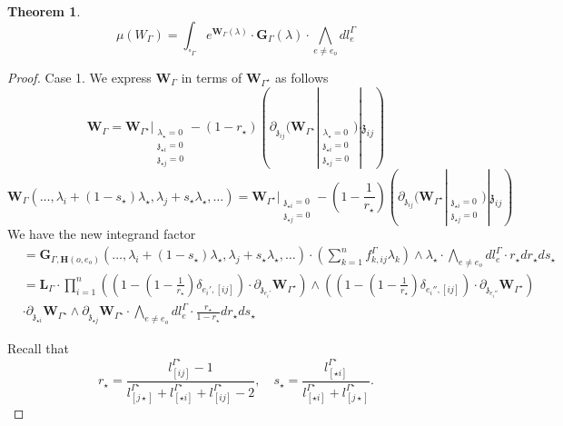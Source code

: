 \documentclass[11pt]{amsart}
\newtheorem{thm}{Theorem}[section]
\theoremstyle{definition}
\theoremstyle{remark}
\numberwithin{equation}{section}
\begin{document}
\begin{thm}
  $$
  \mu(W_{\Gamma})=\int_{\square_{\Gamma}}e^{\mathbf{W}_{\Gamma}(\lambda)}\cdot \mathbf{G}_{\Gamma}(\lambda)\cdot\bigwedge_{e\neq e_{o}}dl^{\Gamma}_{e}
  $$
\end{thm}
\begin{proof}

Case 1. We express $\mathbf{W}_{\Gamma}$ in terms of $\mathbf{W}_{\Gamma^{\star}}$ as follows
$$
\mathbf{W}_{\Gamma}=\mathbf{W}_{\Gamma^{\star}}|_{\substack{\lambda_{\star}=0\\ \mathfrak{z}_{\star i}=0\\\mathfrak{z}_{\star j}=0}}-(1-r_{\star})\left(\partial_{\mathfrak{z}_{ij}}(\mathbf{W}_{\Gamma^{\star}}|_{\substack{\lambda_{\star}=0\\ \mathfrak{z}_{\star i}=0\\\mathfrak{z}_{\star j}=0}})|\mathfrak{z}_{ij}\right)
$$
$$
\mathbf{W}_{\Gamma}(\dots,\lambda_i+(1-s_{\star})\lambda_{\star},\lambda_j+s_{\star}\lambda_{\star},\dots)=\mathbf{W}_{\Gamma^{\star}}|_{\substack{ \mathfrak{z}_{\star i}=0\\\mathfrak{z}_{\star j}=0}}-(1-\frac{1}{r_{\star}})\left(\partial_{\mathfrak{z}_{ij}}(\mathbf{W}_{\Gamma^{\star}}|_{\substack{ \mathfrak{z}_{\star i}=0\\\mathfrak{z}_{\star j}=0}})|\mathfrak{z}_{ij}\right)
$$
 We have the new integrand factor
\begin{align*}
   & =\mathbf{G}_{\Gamma,\mathbf{H}(o,e_o)}(\dots,\lambda_i+(1-s_{\star})\lambda_{\star},\lambda_j+s_{\star}\lambda_{\star},\dots)\cdot(\sum\limits_{k=1}^{n}f^{\Gamma}_{k,ij}\lambda_k)\wedge \lambda_{\star }\cdot\bigwedge_{e\neq e_{o}}dl^{\Gamma}_{e} \cdot r_{\star}dr_{\star}ds_{\star}\\
   &=\mathbf{L}_{\Gamma}\cdot\prod^n_{i=1}\left((1-(1-\frac{1}{r_{\star}})\delta_{e_i',[ij]})\cdot\partial_{\mathfrak{z}_{e_i'}}\mathbf{W}_{\Gamma^{\star}}\right)\wedge\left((1-(1-\frac{1}{r_{\star}})\delta_{e_i'',[ij]})\cdot\partial_{\mathfrak{z}_{e_i''}}\mathbf{W}_{\Gamma^{\star}}\right)\\
   &\cdot  \partial_{\mathfrak{z}_{\star i}}\mathbf{W}_{\Gamma^{\star}}\wedge \partial_{\mathfrak{z}_{\star j}}\mathbf{W}_{\Gamma^{\star}}\cdot \bigwedge_{e\neq e_{o}}dl^{\Gamma}_{e}\cdot  \frac{ r_{\star}}{1- r_{\star}} dr_{\star}ds_{\star}
   \end{align*}

Recall that
$$
 r_{\star}=\frac{l^{\Gamma^\star}_{[ ij]}-1}{l^{\Gamma^\star}_{[ j\star]}+l^{\Gamma^\star}_{[ \star i]}+l^{\Gamma^\star}_{[ ij]}-2},\quad s_{\star}=\frac{l^{\Gamma^\star}_{[ \star i]}}{l^{\Gamma^\star}_{[ \star i]}+l^{\Gamma^\star}_{[ j\star ]}}.
$$



\end{proof}
\end{document}
